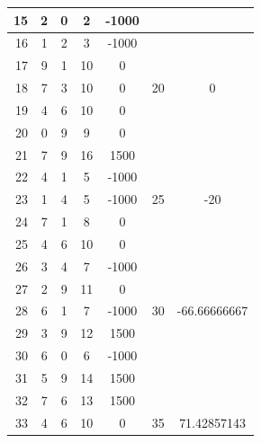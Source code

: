 \documentclass[12pt]{jarticle}
\begin{document}
\begin{table}
\begin{tabular}[h]{|r|c|c|c|c|c|c|}
        15       & 2             & 0             & 2            & -1000 &          &              \\
        \hline16 & 1             & 2             & 3            & -1000 &          &              \\
        17       & 9             & 1             & 10           & 0     &          &              \\
        18       & 7             & 3             & 10           & 0     & 20       & 0            \\
        19       & 4             & 6             & 10           & 0     &          &              \\
        20       & 0             & 9             & 9            & 0     &          &              \\
        \hline21 & 7             & 9             & 16           & 1500  &          &              \\
        22       & 4             & 1             & 5            & -1000 &          &              \\
        23       & 1             & 4             & 5            & -1000 & 25       & -20          \\
        24       & 7             & 1             & 8            & 0     &          &              \\
        25       & 4             & 6             & 10           & 0     &          &              \\
        \hline26 & 3             & 4             & 7            & -1000 &          &              \\
        27       & 2             & 9             & 11           & 0     &          &              \\
        28       & 6             & 1             & 7            & -1000 & 30       & -66.66666667 \\
        29       & 3             & 9             & 12           & 1500  &          &              \\
        30       & 6             & 0             & 6            & -1000 &          &              \\
        \hline31 & 5             & 9             & 14           & 1500  &          &              \\
        32       & 7             & 6             & 13           & 1500  &          &              \\
        33       & 4             & 6             & 10           & 0     & 35       & 71.42857143  \\

\end{tabular}
\end{table}
\end{document}
